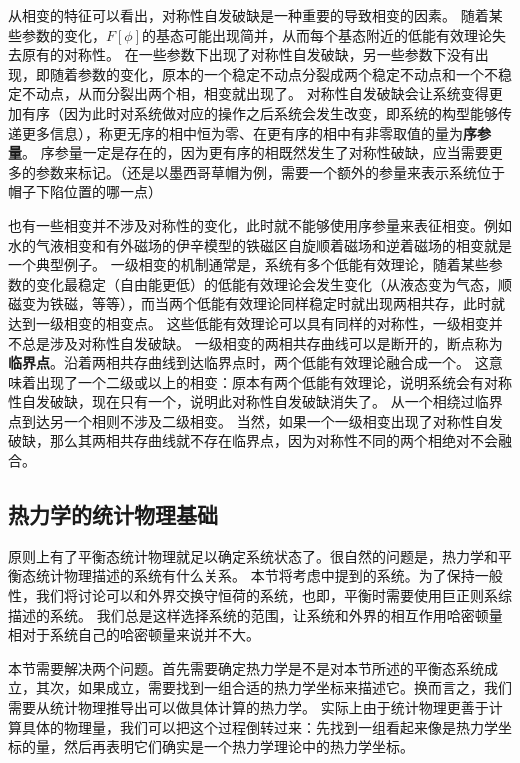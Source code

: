 \documentclass[hyperref, UTF8, a4paper]{ctexart}
\renewcommand{\autoref}{\prettyref}
\begin{document}
从相变的特征可以看出，对称性自发破缺是一种重要的导致相变的因素。
随着某些参数的变化，$F[\phi]$的基态可能出现简并，从而每个基态附近的低能有效理论失去原有的对称性。
在一些参数下出现了对称性自发破缺，另一些参数下没有出现，即随着参数的变化，原本的一个稳定不动点分裂成两个稳定不动点和一个不稳定不动点，从而分裂出两个相，相变就出现了。
对称性自发破缺会让系统变得更加有序（因为此时对系统做对应的操作之后系统会发生改变，即系统的构型能够传递更多信息），称更无序的相中恒为零、在更有序的相中有非零取值的量为\textbf{序参量}。
序参量一定是存在的，因为更有序的相既然发生了对称性破缺，应当需要更多的参数来标记。（还是以墨西哥草帽为例，需要一个额外的参量来表示系统位于帽子下陷位置的哪一点）


也有一些相变并不涉及对称性的变化，此时就不能够使用序参量来表征相变。例如水的气液相变和有外磁场的伊辛模型的铁磁区自旋顺着磁场和逆着磁场的相变就是一个典型例子。
一级相变的机制通常是，系统有多个低能有效理论，随着某些参数的变化最稳定（自由能更低）的低能有效理论会发生变化（从液态变为气态，顺磁变为铁磁，等等），而当两个低能有效理论同样稳定时就出现两相共存，此时就达到一级相变的相变点。
这些低能有效理论可以具有同样的对称性，一级相变并不总是涉及对称性自发破缺。
一级相变的两相共存曲线可以是断开的，断点称为\textbf{临界点}。沿着两相共存曲线到达临界点时，两个低能有效理论融合成一个。
这意味着出现了一个二级或以上的相变：原本有两个低能有效理论，说明系统会有对称性自发破缺，现在只有一个，说明此对称性自发破缺消失了。
从一个相绕过临界点到达另一个相则不涉及二级相变。
当然，如果一个一级相变出现了对称性自发破缺，那么其两相共存曲线就不存在临界点，因为对称性不同的两个相绝对不会融合。

\subsection{热力学的统计物理基础}\label{sec:from-statistical-to-thermo}

原则上有了平衡态统计物理就足以确定系统状态了。很自然的问题是，热力学和平衡态统计物理描述的系统有什么关系。
本节将考虑\autoref{sec:equilibrium-system}中提到的系统。为了保持一般性，我们将讨论可以和外界交换守恒荷的系统，也即，平衡时需要使用巨正则系综描述的系统。
我们总是这样选择系统的范围，让系统和外界的相互作用哈密顿量相对于系统自己的哈密顿量来说并不大。

本节需要解决两个问题。首先需要确定热力学是不是对本节所述的平衡态系统成立，其次，如果成立，需要找到一组合适的热力学坐标来描述它。换而言之，我们需要从统计物理推导出可以做具体计算的热力学。
实际上由于统计物理更善于计算具体的物理量，我们可以把这个过程倒转过来：先找到一组看起来像是热力学坐标的量，然后再表明它们确实是一个热力学理论中的热力学坐标。
\end{document}
